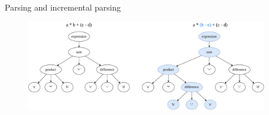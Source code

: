 \documentclass[aspectratio=1610, xcolor=table]{beamer}
\begin{document}
\begin{frame}{Parsing and incremental parsing}
    \begin{figure}
        \begin{center}
            \includegraphics[width=0.95\textwidth]{figures/incrementalparsing2.drawio.pdf}
        \end{center}
    \end{figure}
\end{frame}
\end{document}
